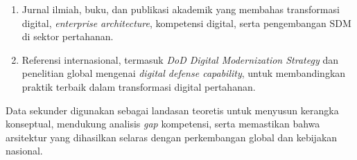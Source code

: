 \begin{enumerate}
\begin{enumerate}
    \item Jurnal ilmiah, buku, dan publikasi akademik yang membahas transformasi digital, \textit{enterprise architecture}, kompetensi digital, serta pengembangan SDM di sektor pertahanan.
    \item Referensi internasional, termasuk \textit{DoD Digital Modernization Strategy} dan penelitian global mengenai \textit{digital defense capability}, untuk membandingkan praktik terbaik dalam transformasi digital pertahanan.
  \end{enumerate}
  Data sekunder digunakan sebagai landasan teoretis untuk menyusun kerangka konseptual, mendukung analisis \textit{gap} kompetensi, serta memastikan bahwa arsitektur yang dihasilkan selaras dengan perkembangan global dan kebijakan nasional.
\end{enumerate}

